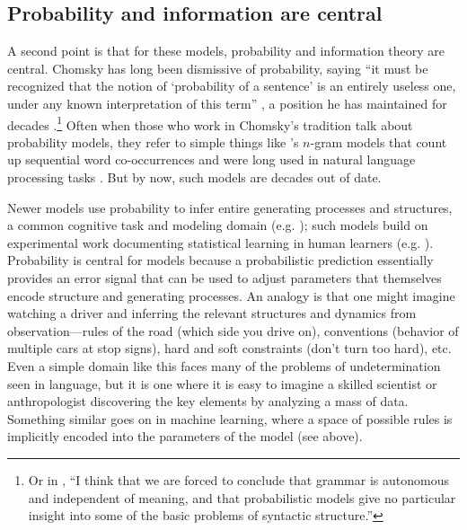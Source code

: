 \documentclass[output=paper,colorlinks,citecolor=brown
]{langscibook}
\begin{document}
\subsection{Probability and information are central}

A second point is that for these models, probability and information theory are central. Chomsky has long been dismissive of probability, saying ``it must be recognized that the notion of ‘probability of a sentence’ is an entirely useless one, under any known interpretation of this term'' \citep{chomsky1969quine}, a position he has maintained for decades \citep{norvig2012colorless}.\footnote{Or in \cite{chomsky1957syntactic}, ``I think that we are forced to conclude that grammar is autonomous and independent of meaning, and that probabilistic models give no particular insight into some of the basic problems of syntactic structure.''} Often when those who work in Chomsky's 
tradition talk about probability models, they refer to simple things like \cite{shannon1948mathematical}'s $n$-gram models that count up sequential word co-occurrences and were long used in natural language processing tasks \citep{chen1999empirical,manning1999foundations}. But by now, such models are decades out of date. 

Newer models use probability to infer entire generating processes and structures, a common cognitive task and modeling domain (e.g. \cite{tenenbaum2011grow,ullman2012theory,lake2015human,goodman2011learning,lake2017building,rule2020child,kemp2008discovery,yang2022one}); such models build on experimental work documenting statistical learning in human learners (e.g. \cite{saffran1996statistical,saffran1996word,aslin1998computation,newport2004learning,aslin2012statistical}). Probability is central for models because a probabilistic prediction essentially provides an error signal that can be used to adjust parameters that themselves encode structure and  generating processes. An analogy is that one might imagine watching a driver and inferring the relevant structures and dynamics from observation---rules of the road (which side you drive on), conventions (behavior of multiple cars at stop signs), hard and soft constraints (don't turn too hard), etc. Even a simple domain like this faces many of the problems of undetermination seen in language, but it is one where it is easy to imagine a skilled scientist or anthropologist discovering the key elements by analyzing a mass of data. Something similar goes on in machine learning, where a space of possible rules is implicitly encoded into the parameters of the model (see above). %
\end{document}
